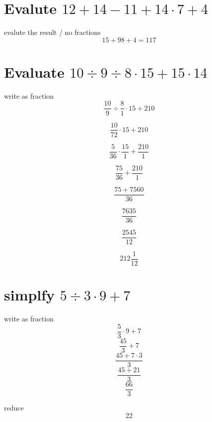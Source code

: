 \documentclass[12pt]{article}
\begin{document}
    
\section{Evalute $12 + 14 -11 + 14 \cdot 7 + 4  $}

evalute the result / no fractions
$$ 15 + 98  + 4 = 117$$

\section{Evaluate $10 \div 9 \div 8 \cdot 15 + 15 \cdot 14$}

write as fraction
$$ \frac{10}{9} \div \frac{8}{1} \cdot 15 + 210 $$

$$ \frac{10}{72} \cdot 15 + 210 $$

$$ \frac{5}{36} \cdot \frac{15}{1} + \frac{210}{1} $$

$$ \frac{75}{36} + \frac{210}{1} $$ 

$$ \frac{75+7560}{36} $$ 

$$ \frac{7635}{36} $$ 

$$ \frac{2545}{12} $$

$$ 212\frac{1}{12} $$



\section{simplfy $5 \div 3 \cdot 9 + 7$}

write as fraction 
$$ \frac{5}{3} \cdot 9 + 7 $$
$$ \frac{45}{3}  + 7 $$
$$ \frac{45 + 7 \cdot 3}{3} $$
$$ \frac{45 + 21}{3} $$
$$ \frac{66}{3} $$

reduce 
$$ 22 $$
\end{document}
